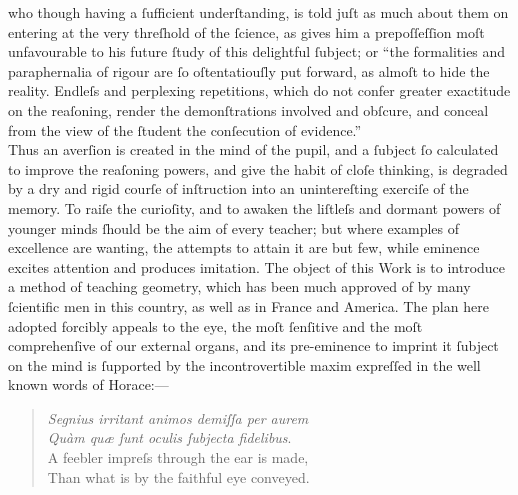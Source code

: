 \begin{minipage}{0.20\textwidth}
    \phantom{}
\end{minipage}%
\begin{minipage}{0.80\textwidth}
    who though having a ſufficient underſtanding, is told juſt as much about them on entering at the very threſhold of the ſcience, as gives him a prepoſſeſſion moſt unfavourable to his future ſtudy of this delightful ſubject; or “the formalities and paraphernalia of rigour are ſo oſtentatiouſly put forward, as almoſt to hide the reality. Endleſs and perplexing repetitions, which do not confer greater exactitude on the reaſoning, render the demonſtrations involved and obſcure, and conceal from the view of the ſtudent the conſecution of evidence.”\\

    Thus an averſion is created in the mind of the pupil, and a ſubject ſo calculated to improve the reaſoning powers, and give the habit of cloſe thinking, is degraded by a dry and rigid courſe of inſtruction into an unintereſting exerciſe of the memory. To raiſe the curioſity, and to awaken the liſtleſs and dormant powers of younger minds ſhould be the aim of every teacher; but where examples of excellence are wanting, the attempts to attain it are but few, while eminence excites attention and produces imitation. The object of this Work is to introduce a method of teaching geometry, which has been much approved of by many ſcientific men in this country, as well as in France and America. The plan here adopted forcibly appeals to the eye, the moſt ſenſitive and the moſt comprehenſive of our external organs, and its pre-eminence to imprint it ſubject on the mind is ſupported by the incontrovertible maxim expreſſed in the well known words of Horace:—\\

    \begin{quotation}
        \noindent \small{\textit{Segnius irritant animos demiſſa per aurem\\
                Quàm quæ ſunt oculis ſubjecta fidelibus}}.\\

        \noindent \small{A feebler impreſs through the ear is made,\\
            Than what is by the faithful eye conveyed}.
    \end{quotation}
\end{minipage}

\newpage


